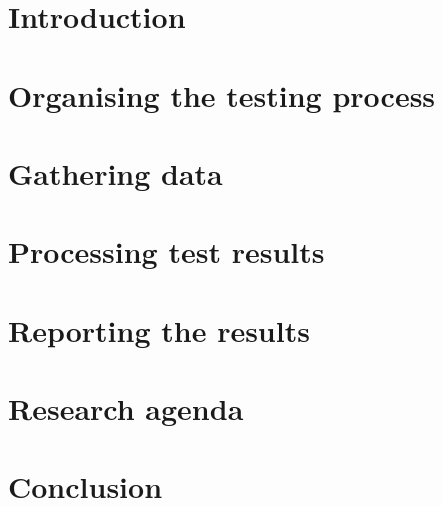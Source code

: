 \documentclass[oneside]{book}
\begin{document}
\clearpage %
\tableofcontents

\clearpage %
\listoffigures


\mainmatter

\chapter{Introduction}
\label{chapter:indroduction}


\chapter{Organising the testing process}
\label{chapter:organising}


\chapter{Gathering data}
\label{chapter:gathering}


\chapter{Processing test results}
\label{chapter:filtering}


% 

% 

\chapter{Reporting the results}
\label{chapter:reporting}


\chapter{Research agenda}
\label{chapter:agenda}


\newpage

\chapter{Conclusion}
\label{chapter:agenda}




\backmatter

{}



\end{document}
